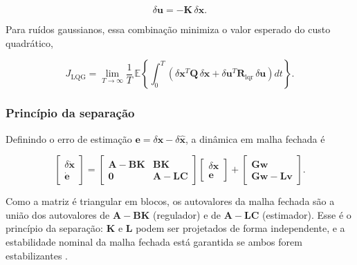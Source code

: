 \begin{equation}\label{eq:lqg_lei}
\delta\mathbf{u}=-\mathbf{K}\,\delta\hat{\mathbf{x}}.
\end{equation}

\noindent Para ruídos gaussianos, essa combinação minimiza o valor esperado do custo quadrático,

\begin{equation}\label{eq:custo_lqg}
J_{\mathrm{LQG}}=\lim_{T\to\infty}\frac{1}{T}\,\mathbb{E}\left\{\int_0^{T}\left(\delta\mathbf{x}^{T}\mathbf{Q}\,\delta\mathbf{x}+\delta\mathbf{u}^{T}\mathbf{R}_{\mathrm{lqr}}\,\delta\mathbf{u}\right)dt\right\}.
\end{equation}

\subsubsection{Princípio da separação}

Definindo o erro de estimação $\mathbf{e}=\delta\mathbf{x}-\delta\hat{\mathbf{x}}$, a dinâmica em malha fechada é

\begin{equation}\label{eq:separacao}
\begin{bmatrix}\delta\dot{\mathbf{x}}\\ \dot{\mathbf{e}}\end{bmatrix}
=
\begin{bmatrix}\mathbf{A}-\mathbf{B}\mathbf{K} & \mathbf{B}\mathbf{K}\\ \mathbf{0} & \mathbf{A}-\mathbf{L}\mathbf{C}\end{bmatrix}
\begin{bmatrix}\delta\mathbf{x}\\ \mathbf{e}\end{bmatrix}
+
\begin{bmatrix}\mathbf{G}\mathbf{w}\\ \mathbf{G}\mathbf{w}-\mathbf{L}\mathbf{v}\end{bmatrix}.
\end{equation}

\noindent Como a matriz é triangular em blocos, os autovalores da malha fechada são a união dos autovalores de $\mathbf{A}-\mathbf{B}\mathbf{K}$ (regulador) e de $\mathbf{A}-\mathbf{L}\mathbf{C}$ (estimador). Esse é o princípio da separação: $\mathbf{K}$ e $\mathbf{L}$ podem ser projetados de forma independente, e a estabilidade nominal da malha fechada está garantida se ambos forem estabilizantes \cite{athans1971,anderson1990}.

